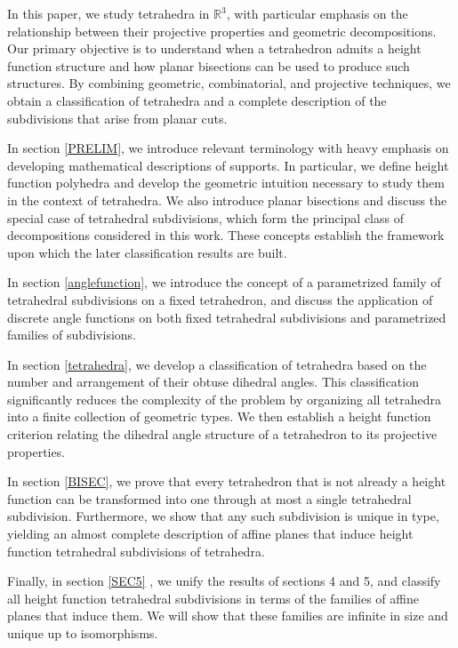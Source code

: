 \documentclass{mainresearch}
\begin{document}
In this paper, we study tetrahedra in $\mathbb{R}^3$, with particular emphasis on the relationship between their projective properties and geometric decompositions. Our primary objective is to understand when a tetrahedron admits a height function structure and how planar bisections can be used to produce such structures. By combining geometric, combinatorial, and projective techniques, we obtain a classification of tetrahedra and a complete description of the subdivisions that arise from planar cuts.

In section \ref{PRELIM}, we introduce relevant terminology with heavy emphasis on developing mathematical descriptions of supports. In particular, we define height function polyhedra and develop the geometric intuition necessary to study them in the context of tetrahedra. We also introduce planar bisections and discuss the special case of tetrahedral subdivisions, which form the principal class of decompositions considered in this work. These concepts establish the framework upon which the later classification results are built.

In section \ref{anglefunction}, we introduce the concept of a parametrized family of tetrahedral subdivisions on a fixed tetrahedron, and discuss the application of discrete angle functions on both fixed tetrahedral subdivisions and parametrized families of subdivisions.

In section \ref{tetrahedra}, we develop a classification of tetrahedra based on the number and arrangement of their obtuse dihedral angles. This classification significantly reduces the complexity of the problem by organizing all tetrahedra into a finite collection of geometric types. We then establish a height function criterion relating the dihedral angle structure of a tetrahedron to its projective properties.

In section \ref{BISEC}, we prove that every tetrahedron that is not already a height function can be transformed into one through at most a single tetrahedral subdivision. Furthermore, we show that any such subdivision is unique in type, yielding an almost complete description of affine planes that induce height function tetrahedral subdivisions of tetrahedra. 

Finally, in section \ref{SEC5}  , we unify the results of sections 4 and 5, and classify all height function tetrahedral subdivisions in terms of the families of affine planes that induce them. We will show that these families are infinite in size and unique up to isomorphisms.
\end{document}
